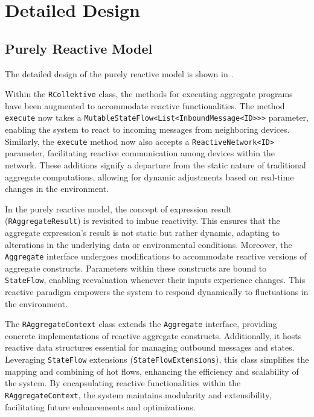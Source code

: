 \section{Detailed Design}

\subsection{Purely Reactive Model}
\label{subsection:purely-reactive-model}

The detailed design of the purely reactive model is shown in .

Within the \texttt{RCollektive} class, the methods for executing aggregate programs have been augmented to accommodate reactive functionalities. The method \texttt{execute} now takes a \texttt{MutableStateFlow<List<InboundMessage<ID>>>} parameter, enabling the system to react to incoming messages from neighboring devices. Similarly, the \texttt{execute} method now also accepts a \texttt{ReactiveNetwork<ID>} parameter, facilitating reactive communication among devices within the network. These additions signify a departure from the static nature of traditional aggregate computations, allowing for dynamic adjustments based on real-time changes in the environment.

In the purely reactive model, the concept of expression result (\texttt{RAggregateResult}) is revisited to imbue reactivity. This ensures that the aggregate expression's result is not static but rather dynamic, adapting to alterations in the underlying data or environmental conditions. Moreover, the \texttt{Aggregate} interface undergoes modifications to accommodate reactive versions of aggregate constructs. Parameters within these constructs are bound to \texttt{StateFlow}, enabling reevaluation whenever their inputs experience changes. This reactive paradigm empowers the system to respond dynamically to fluctuations in the environment.

The \texttt{RAggregateContext} class extends the \texttt{Aggregate} interface, providing concrete implementations of reactive aggregate constructs. Additionally, it hosts reactive data structures essential for managing outbound messages and states. Leveraging \texttt{StateFlow} extensions (\texttt{StateFlowExtensions}), this class simplifies the mapping and combining of hot flows, enhancing the efficiency and scalability of the system. By encapsulating reactive functionalities within the \texttt{RAggregateContext}, the system maintains modularity and extensibility, facilitating future enhancements and optimizations.

